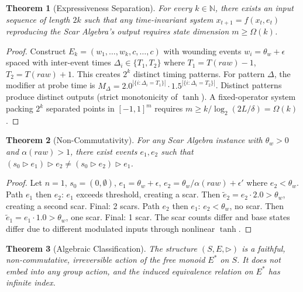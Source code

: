 \documentclass[11pt]{article}
\newtheorem{theorem}{Theorem}[section]
\begin{document}
\begin{theorem}[Expressiveness Separation]
\label{thm:scar-expressiveness}
For every $k \in \mathbb{N}$, there exists an input sequence of length $2k$ such that any time-invariant system $x_{t+1} = f(x_t, e_t)$ reproducing the Scar Algebra's output requires state dimension $m \geq \Omega(k)$.
\end{theorem}

\begin{proof}
Construct $E_k = (w_1, \ldots, w_k, c, \ldots, c)$ with wounding events $w_i = \theta_w + \epsilon$ spaced with inter-event times $\Delta_i \in \{T_1, T_2\}$ where $T_1 = T(raw)-1$, $T_2 = T(raw)+1$. This creates $2^k$ distinct timing patterns. For pattern $\Delta$, the modifier at probe time is $M_\Delta = 2.0^{|\{i: \Delta_i = T_1\}|} \cdot 1.5^{|\{i: \Delta_i = T_2\}|}$. Distinct patterns produce distinct outputs (strict monotonicity of $\tanh$). A fixed-operator system packing $2^k$ separated points in $[-1,1]^m$ requires $m \geq k / \log_2(2L/\delta) = \Omega(k)$.
\end{proof}

\begin{theorem}[Non-Commutativity]
\label{thm:scar-noncommute}
For any Scar Algebra instance with $\theta_w > 0$ and $\alpha(raw) > 1$, there exist events $e_1, e_2$ such that $(s_0 \triangleright e_1) \triangleright e_2 \neq (s_0 \triangleright e_2) \triangleright e_1$.
\end{theorem}

\begin{proof}
Let $n=1$, $s_0 = (0, \emptyset)$, $e_1 = \theta_w + \epsilon$, $e_2 = \theta_w / \alpha(raw) + \epsilon'$ where $e_2 < \theta_w$. Path $e_1$ then $e_2$: $e_1$ exceeds threshold, creating a scar. Then $\tilde{e}_2 = e_2 \cdot 2.0 > \theta_w$, creating a second scar. Final: 2 scars. Path $e_2$ then $e_1$: $e_2 < \theta_w$, no scar. Then $\tilde{e}_1 = e_1 \cdot 1.0 > \theta_w$, one scar. Final: 1 scar. The scar counts differ and base states differ due to different modulated inputs through nonlinear $\tanh$.
\end{proof}

\begin{theorem}[Algebraic Classification]
\label{thm:scar-algebra-class}
The structure $(S, E, \triangleright)$ is a faithful, non-commutative, irreversible action of the free monoid $E^*$ on $S$. It does not embed into any group action, and the induced equivalence relation on $E^*$ has infinite index.
\end{theorem}
\end{document}
